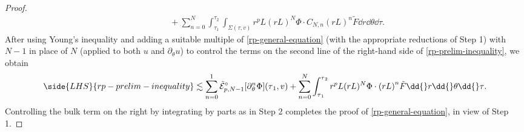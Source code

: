 \documentclass[10pt, reqno]{amsart}
\begin{document}
\begin{proof}
\begin{equation}
\begin{split}
&\qquad + \sum_{n=0}^N\int_{\tau{}_1}^{\tau{}_2} \int _{\Sigma{}(\tau{},v)}r^pL(rL)^N\Phi{}\cdot C_{N,n}{(rL)}^n\tilde{F}\dd{}r\dd{}\theta{}\dd{}\tau{}.
\end{split}
\end{equation}
After using Young's inequality and adding a suitable multiple of
\cref{rp-general-equation} (with the appropriate reductions of Step 1) with \(N-1\)
in place of \(N\) (applied to both \(u\) and \(\partial_\theta{}u\)) to control
the terms on the second line of the right-hand side of \cref{rp-prelim-inequality}, we
obtain
\begin{equation}
\begin{split}
\side{LHS}{rp-prelim-inequality}\lesssim \sum_{n=0}^1\tilde{\mathcal{E}}_{p,N-1}^{\circ }[\partial{}_\theta^n\Phi{}](\tau{}_1,v) + \sum_{n=0}^N\int_{\tau{}_1}^{\tau{}_2} r^pL(rL)^N\Phi{}\cdot {(rL)}^n\tilde{F}\dd{}r\dd{}\theta{}\dd{}\tau{}.
\end{split}
\end{equation}
Controlling the bulk term on the right by integrating by parts as in Step 2
completes the proof of \cref{rp-general-equation}, in view of Step 1.
\end{proof}
\end{document}
